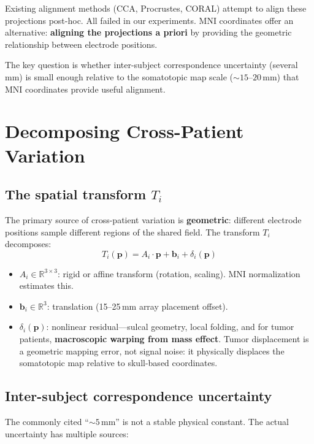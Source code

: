 \documentclass[11pt,letterpaper]{article}
\newcommand{\bfp}{\mathbf{p}}
\newcommand{\bfb}{\mathbf{b}}
\newcommand{\R}{\mathbb{R}}
\begin{document}
Existing alignment methods (CCA, Procrustes, CORAL) attempt to align these projections post-hoc. All failed in our experiments. MNI coordinates offer an alternative: \textbf{aligning the projections a priori} by providing the geometric relationship between electrode positions.

The key question is whether inter-subject correspondence uncertainty (several mm) is small enough relative to the somatotopic map scale (${\sim}15$--$20$\,mm) that MNI coordinates provide useful alignment.


\section{Decomposing Cross-Patient Variation}

\subsection{The spatial transform $T_i$}

The primary source of cross-patient variation is \textbf{geometric}: different electrode positions sample different regions of the shared field. The transform $T_i$ decomposes:
\begin{equation}\label{eq:transform}
T_i(\bfp) = A_i \cdot \bfp + \bfb_i + \delta_i(\bfp)
\end{equation}
\begin{itemize}[leftmargin=2em]
\item $A_i \in \R^{3 \times 3}$: rigid or affine transform (rotation, scaling). MNI normalization estimates this.
\item $\bfb_i \in \R^3$: translation (15--25\,mm array placement offset).
\item $\delta_i(\bfp)$: nonlinear residual---sulcal geometry, local folding, and for tumor patients, \textbf{macroscopic warping from mass effect}. Tumor displacement is a geometric mapping error, not signal noise: it physically displaces the somatotopic map relative to skull-based coordinates.
\end{itemize}

\subsection{Inter-subject correspondence uncertainty}

The commonly cited ``${\sim}5$\,mm'' is not a stable physical constant. The actual uncertainty has multiple sources:
\end{document}
